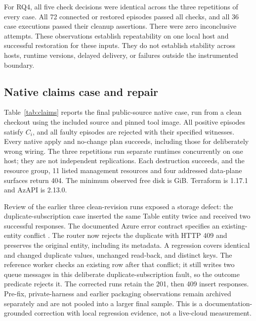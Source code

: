 \documentclass[10pt,a4paper]{article}
\begin{document}
For RQ4, all five check decisions were identical across the three repetitions of every case. All 72 connected or restored episodes passed all checks, and all 36 case executions passed their cleanup assertions. There were zero inconclusive attempts. These observations establish repeatability on one local host and successful restoration for these inputs. They do not establish stability across hosts, runtime versions, delayed delivery, or failures outside the instrumented boundary.

\begin{table}[ht]
\centering\scriptsize
\caption{Per-mutation detections, identical in all three repetitions. X means the check rejected the faulty configuration; a dot means it accepted it. M: management; W: workflow; A: arrival; T: exact at target; E: exclusive outcome.}\label{tab:mutations}

\end{table}

\subsection{Native claims case and repair}
Table~\ref{tab:claims} reports the final public-source native case, run from a clean checkout using the included source and pinned tool image. All \ClaimsPositives{} positive episodes satisfy $C_i$, and all \ClaimsFaultEpisodes{} faulty episodes are rejected with their specified witnesses. Every native apply and no-change plan succeeds, including those for deliberately wrong wiring. The three repetitions run separate runtimes concurrently on one host; they are not independent replications. Each destruction succeeds, and the resource group, 11 listed management resources and four addressed data-plane surfaces return 404. The minimum observed free disk is \ClaimsMinimumFree{} GiB. Terraform is 1.17.1 and AzAPI is 2.13.0.

\begin{table}[ht]
\centering\small
\caption{One refined native scenario. Callback and message counts are per episode. Rejection is the expected outcome for the three fault configurations.}\label{tab:claims}

\end{table}

Review of the earlier three clean-revision runs exposed a storage defect: the duplicate-subscription case inserted the same Table entity twice and received two successful responses. The documented Azure error contract specifies an existing-entity conflict \cite{tableerrors}. The router now rejects the duplicate with HTTP 409 and preserves the original entity, including its metadata. A regression covers identical and changed duplicate values, unchanged read-back, and distinct keys. The reference worker checks an existing row after that conflict; it still writes two queue messages in this deliberate duplicate-subscription fault, so the outcome predicate rejects it. The corrected runs retain the 201, then 409 insert responses. Pre-fix, private-harness and earlier packaging observations remain archived separately and are not pooled into a larger final sample. This is a documentation-grounded correction with local regression evidence, not a live-cloud measurement.
\end{document}
